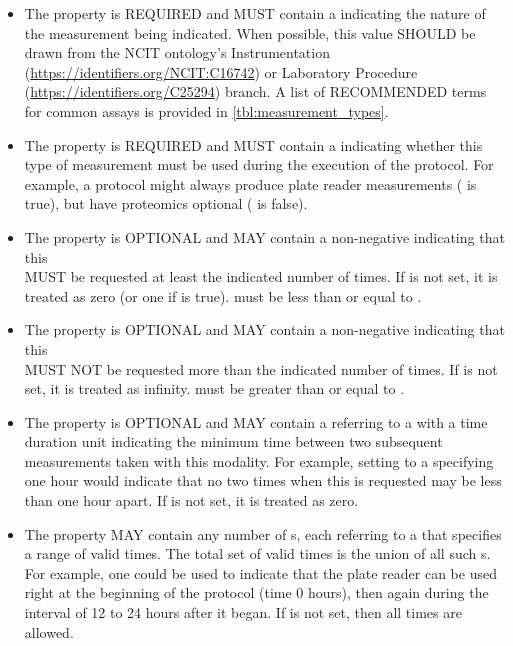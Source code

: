 \begin{itemize}
\item \label{sec:type}
The  property is REQUIRED and MUST contain a  indicating the nature of the measurement being indicated.
When possible, this value SHOULD be drawn from the NCIT ontology's Instrumentation (\url{https://identifiers.org/NCIT:C16742}) or Laboratory Procedure (\url{https://identifiers.org/C25294}) branch.
A list of RECOMMENDED terms for common assays is provided in \ref{tbl:measurement_types}.

\item \label{sec:required}
The  property is REQUIRED and MUST contain a  indicating whether this type of measurement must be used during the execution of the protocol. 
For example, a protocol might always produce plate reader measurements ( is true), but have proteomics optional ( is false).

\item \label{sec:minCount}
The  property is OPTIONAL and MAY contain a non-negative  indicating that this \\ MUST be requested at least the indicated number of times.
If  is not set, it is treated as zero (or one if  is true).
 must be less than or equal to .

\item \label{sec:maxCount}
The  property is OPTIONAL and MAY contain a non-negative  indicating that this \\ MUST NOT be requested more than the indicated number of times.
If  is not set, it is treated as infinity.
 must be greater than or equal to .


\item \label{sec:minInterval}
The  property is OPTIONAL and MAY contain a  referring to a  with a time duration unit indicating the minimum time between two subsequent measurements taken with this modality.
For example, setting  to a  specifying one hour would indicate that no two times when this  is requested may be less than one hour apart.
If  is not set, it is treated as zero.

\item \label{sec:allowedTime}
The  property MAY contain any number of s, each referring to a  that specifies a range of valid times.
The total set of valid times is the union of all such s.
For example, one  could be used to indicate that the plate reader can be used right at the beginning of the protocol (time 0 hours), then again during the interval of 12 to 24 hours after it began.
If  is not set, then all times are allowed.
\end{itemize}

